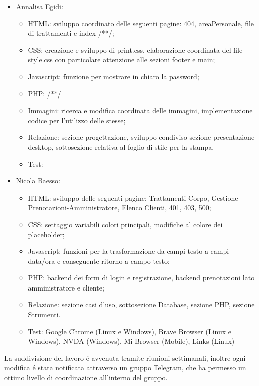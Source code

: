 \documentclass{article}
\begin{document}
\begin{itemize}
\begin{itemize}
	\end{itemize} 
	\item Annalisa Egidi:
	\begin{itemize}
		\item HTML: sviluppo coordinato delle seguenti pagine: 404, areaPersonale, file di trattamenti e index /**/;
		\item CSS: creazione e sviluppo di print.css, elaborazione coordinata del file style.css con particolare attenzione alle sezioni footer e main;
		\item Javascript: funzione per mostrare in chiaro la password;
		\item PHP: /**/
		\item Immagini: ricerca e modifica coordinata delle immagini, implementazione codice per l'utilizzo delle stesse;
		\item Relazione: sezione progettazione, sviluppo condiviso sezione presentazione desktop, sottosezione relativa al foglio di stile per la stampa.
		\item Test: 
	\end{itemize} 
	\item Nicola Baesso:
	\begin{itemize}
		\item HTML: sviluppo delle seguenti pagine: Trattamenti Corpo, Gestione Prenotazioni-Amministratore, Elenco Clienti, 401, 403, 500;
		\item CSS: settaggio variabili colori principali, modifiche al colore dei placeholder;
		\item Javascript: funzioni per la trasformazione da campi testo a campi data/ora e conseguente ritorno a campo testo;
		\item PHP: backend dei form di login e registrazione, backend prenotazioni lato amministratore e cliente;
		\item Relazione: sezione casi d'uso, sottosezione Database, sezione PHP, sezione Strumenti.
		\item Test: Google Chrome (Linux e Windows), Brave Browser (Linux e Windows), NVDA (Windows), Mi Browser (Mobile), Links (Linux)
	\end{itemize} 
\end{itemize}
La suddivisione del lavoro é avvenuta tramite riunioni settimanali, inoltre ogni modifica é stata notificata attraverso un gruppo Telegram, che ha permesso un ottimo livello di coordinazione all'interno del gruppo.
\end{document}
